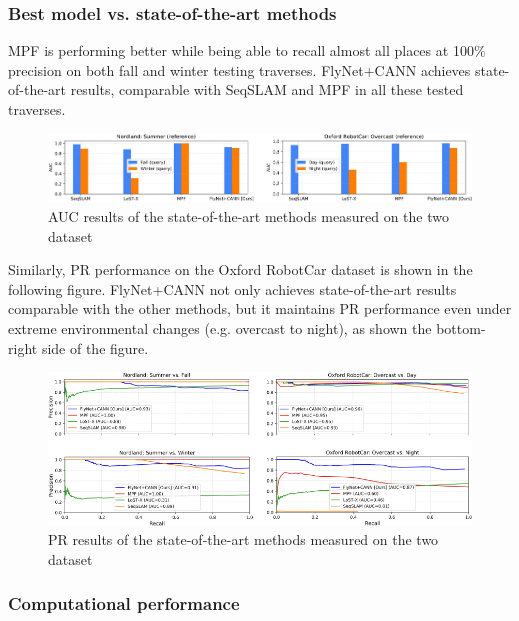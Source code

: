 \newpage

\subsubsection{Best model vs. state-of-the-art
methods}\label{header-n221}

MPF is performing better while being able to recall almost all places at
100\% precision on both fall and winter testing traverses. FlyNet+CANN
achieves state-of-the-art results, comparable with SeqSLAM and MPF in
all these tested traverses.

\begin{figure}[h!]
\centering
\includegraphics[width=1\linewidth]{images/bestmodelvsothers.png}
\caption{AUC results of the state-of-the-art methods measured on the two dataset}
\end{figure}

Similarly, PR performance on the Oxford RobotCar dataset is shown in the
following figure. FlyNet+CANN not only achieves state-of-the-art results
comparable with the other methods, but it maintains PR performance even
under extreme environmental changes (e.g. overcast to night), as shown
the bottom-right side of the figure.

\begin{figure}[h!]
\centering
\includegraphics[width=1\linewidth]{images/bestmodelvsothersPR.png}
\caption{PR results of the state-of-the-art methods measured on the two dataset}
\end{figure}

\subsubsection{Computational performance}\label{header-n226}


